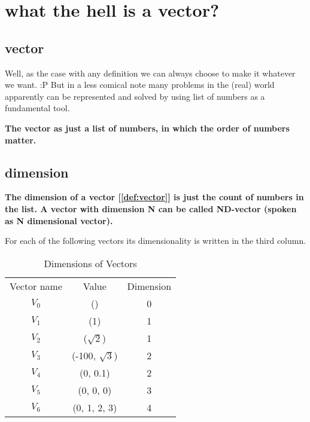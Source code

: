 \documentclass[../main.tex]{subfiles}
\begin{document}
\chapter{what the hell is a vector?}

\section{vector}
Well, as the case with any definition we can always choose to make it whatever we want. :P
But in a less comical note many problems in the (real) world apparently can be represented and solved by using list of numbers as a fundamental tool.

\begin{definition}
  \label{def:vector}

  \textbf{The vector as just a list of numbers, in which the order of numbers matter.}

\end{definition}


\section{dimension}
\begin{definition}
  \label{def:vector_dimension}

  \textbf{The dimension of a vector [\ref{def:vector}] is just the count of numbers in the list.
A vector with dimension N can be called ND-vector (spoken as N dimensional vector).}

\end{definition}

For each of the following vectors its dimensionality is written in the third column.

\begin{table}[ht]
  \centering
  \begin{tabular}{ c  c  c }
    Vector name & Value & Dimension\\
    $ V_0 $ & () & 0\\
    $ V_1 $ & (1) & 1\\
    $ V_2 $ & ($\sqrt{2}$) & 1\\
    $ V_3 $ & (-100, $\sqrt{3}$) & 2\\
    $ V_4 $ & (0, 0.1) & 2\\
    $ V_5 $ & (0, 0, 0) & 3\\
    $ V_6 $ & (0, 1, 2, 3) & 4\\
  \end{tabular}
\caption{Dimensions of Vectors}
\label{tab:dim}
\end{table}
\end{document}
